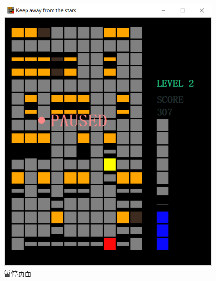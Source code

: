 \documentclass[UTF8]{article}
\begin{document}
\begin{figure}[htbp]
\begin{minipage}[t]{0.48\textwidth}
\includegraphics[scale=0.3]{fig_3.png}
\caption{暂停页面}
\end{minipage}
\end{figure}
\end{document}
